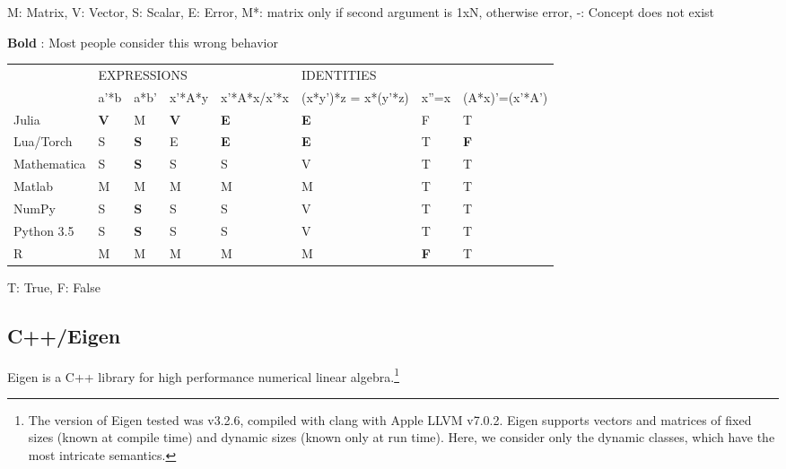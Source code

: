 M: Matrix, V: Vector, S: Scalar, E: Error, M{*}: matrix only if second
argument is 1xN, otherwise error, -: Concept does not exist

\textbf{Bold} : Most people consider this wrong behavior

\begin{tabular}{|l|l|l|l|l|l|l|l|}
\cline{2-8}
\multicolumn{1}{l|}{} & \multicolumn{4}{l|}{EXPRESSIONS} & \multicolumn{3}{l|}{IDENTITIES}\tabularnewline
\cline{2-8}
\multicolumn{1}{l|}{} & a'{*}b & a{*}b' & x'{*}A{*}y & x'{*}A{*}x/x'{*}x & (x{*}y'){*}z = x{*}(y'{*}z) & x''=x & (A{*}x)'=(x'{*}A')\tabularnewline
\hline
Julia & \textbf{V} & M & \textbf{V} & \textbf{E} & \textbf{E} & F & T\tabularnewline
\hline
Lua/Torch & S & \textbf{S} & E & \textbf{E} & \textbf{E} & T & \textbf{F}\tabularnewline
\hline
Mathematica & S & \textbf{S} & S & S & V & T & T\tabularnewline
\hline
Matlab & M & M & M & M & M & T & T\tabularnewline
\hline
NumPy & S & \textbf{S} & S & S & V & T & T\tabularnewline
\hline
Python 3.5 & S & \textbf{S} & S & S & V & T & T\tabularnewline
\hline
R & M & M & M & M & M & \textbf{F} & T\tabularnewline
\hline
\end{tabular}

T: True, F: False



\subsection{C++/Eigen}

Eigen is a C++ library for high performance numerical linear
algebra.\cite{eigenweb}\footnote{The version of Eigen tested was v3.2.6,
compiled with clang with Apple LLVM v7.0.2. Eigen supports vectors and
matrices of fixed sizes (known at compile time) and dynamic sizes (known only
at run time). Here, we consider only the dynamic classes, which have 
the most intricate semantics.
}

